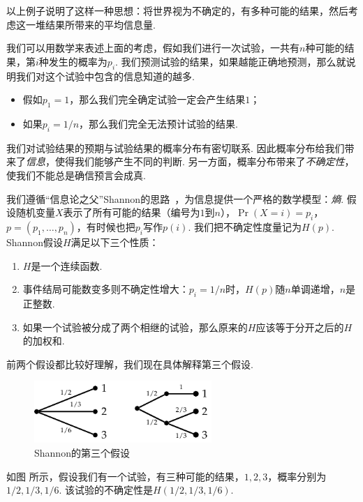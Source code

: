 以上例子说明了这样一种思想：将世界视为不确定的，有多种可能的结果，然后考虑这一堆结果所带来的平均信息量.

我们可以用数学来表述上面的考虑，假如我们进行一次试验，一共有$n$种可能的结果，第$i$种发生的概率为$p_i$. 我们预测试验的结果，如果越能正确地预测，那么就说明我们对这个试验中包含的信息知道的越多. 
\begin{itemize}
    \item 假如$p_1=1$，那么我们完全确定试验一定会产生结果$1$；
    \item 如果$p_i=1/n$，那么我们完全无法预计试验的结果.
\end{itemize}
我们对试验结果的预期与试验结果的概率分布有密切联系. 因此概率分布给我们带来了\textit{信息}，使得我们能够产生不同的判断. 另一方面，概率分布带来了\textit{不确定性}，使我们不能总是确信预言会成真. 

我们遵循“信息论之父”Shannon的思路~\cite{shannonMathematicalTheoryCommunication1948}，为信息提供一个严格的数学模型：\textit{熵}. 假设随机变量$X$表示了所有可能的结果（编号为$1$到$n$），$\Pr(X=i)=p_i$，$p=(p_1,\dots,p_n)$，有时候也把$p_i$写作$p(i)$. 我们把不确定性度量记为$H(p)$. Shannon假设$H$满足以下三个性质：
\begin{enumerate}
    \item $H$是一个连续函数.
    \item 事件结局可能数变多则不确定性增大：$p_i=1/n$时，$H(p)$随$n$单调递增，$n$是正整数.
    \item 如果一个试验被分成了两个相继的试验，那么原来的$H$应该等于分开之后的$H$的加权和.
\end{enumerate}

前两个假设都比较好理解，我们现在具体解释第三个假设.  
\begin{figure}[ht]
    \centering
    \includegraphics[width=0.6\textwidth]{figures/information-theory/decomposition-assumption.pdf}
    \caption{Shannon的第三个假设}
    \label{fig:decomposition-assumption}
\end{figure}

如图 所示，假设我们有一个试验，有三种可能的结果，$1,2,3$，概率分别为$1/2,1/3,1/6$. 该试验的不确定性是$H(1/2,1/3,1/6)$. 

